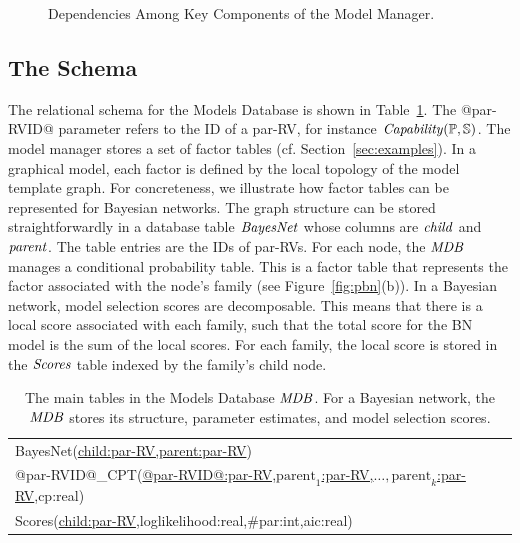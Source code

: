 \documentclass{IEEEtran}
\begin{document}
\begin{figure}[htbp]
\begin{center}
\caption{Dependencies Among Key Components of the Model  Manager. 
\label{fig:learning}}
\end{center}
\end{figure}

\subsection{The \MDB Schema}

The relational schema for the Models Database is shown in Table~\ref{table:mdb-schema}. The @par-RVID@ parameter refers to the ID  of a par-RV, for instance $\it{Capability}(\P,\S)$.
The model manager stores a set of factor tables (cf. Section~\ref{sec:examples}). In a graphical model, each factor is defined by the local topology of the model template graph. For concreteness, we illustrate how factor tables can be represented  for Bayesian networks. The graph structure can be stored straightforwardly in a database table $\it{BayesNet}$ whose columns are $\it{child}$ and $\it{parent}$. The table entries are the IDs of par-RVs. 
For each node, the $\MDB$ manages a conditional probability table. This is a factor table that represents the factor associated with the node's family (see Figure~\ref{fig:pbn}(b)).
In a Bayesian network, model selection scores are decomposable. This means that there is a local score associated with each family, such that the total score for the BN model is the sum of the local scores. For each family, the local score is stored in the $\it{Scores}$ table indexed by the family's child node.

\begin{table}[tbp]
\caption{The main tables in the Models Database $\MDB$. For a Bayesian network, the $\MDB$ stores its structure, parameter estimates, and model selection scores.}
 \centering
 \begin{tabular}
[c]{|l|}\hline
BayesNet(\underline{child:par-RV,parent:par-RV})\\
@par-RVID@\_CPT(\underline{@par-RVID@:par-RV,$\mbox{parent}_{1}$:par-RV,$\ldots,\mbox{parent}_{k}$:par-RV},cp:real)\\ 
Scores(\underline{child:par-RV},loglikelihood:real,\#par:int,aic:real)\\
\hline
\end{tabular}
\label{table:mdb-schema}
\end{table}
\end{document}
